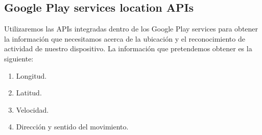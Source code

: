 \subsection{Google Play services location APIs}

Utilizaremos las APIs integradas dentro de los Google Play services para obtener la información que necesitamos acerca de la ubicación y el reconocimiento de actividad de nuestro dispositivo. La información que pretendemos obtener es la siguiente:

\begin{enumerate}
\item Longitud.
\item Latitud.
\item Velocidad.
\item Dirección y sentido del movimiento.
\end{enumerate}